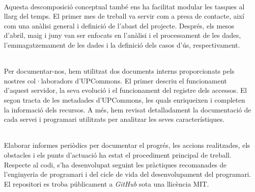 \noindent \\
Aquesta descomposició conceptual també ens ha facilitat modular les tasques al llarg del temps.
El primer mes de treball va servir com a presa de contacte, així com una anàlisi general i definició de l'abast del projecte.
Després, els mesos d'abril, maig i juny van ser enfocats en l'anàlisi i el processament de les dades, l'emmagatzemament de les dades i la definició dels casos d'ús, respectivament.

\noindent \\
Per documentar-nos, hem utilitzat dos documents interns proporcionats pels nostres col·laboradors d'\gls{UPCommons}.
El primer descriu el funcionament d'aquest servidor, la seva evolució i el funcionament del registre dels accessos.
El segon tracta de les metadades d'\gls{UPCommons}, les quals enriqueixen i completen la informació dels recursos.
A més, hem revisat detalladament la documentació de cada servei i programari utilitzats per analitzar les seves característiques.

\noindent \\
Elaborar informes periòdics per documentar el progrés, les accions realitzades, els obstacles i els punts d'actuació ha estat el procediment principal de treball.
Respecte al codi, s'ha desenvolupat seguint les pràctiques recomanades de l'enginyeria de programari i del cicle de vida del desenvolupament del programari.
El repositori es troba públicament a \textit{\gls{GitHub}} sota una llicència MIT.
